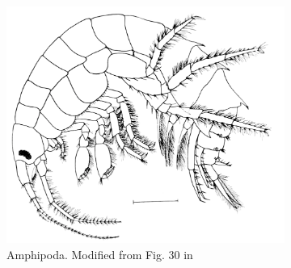 \documentclass[letterpaper, 11pt]{article}
\begin{document}
\begin{figure}[ht!]
    \centering
    \begin{subfigure}[ht!]{0.45\textwidth}
        \includegraphics[width=\textwidth]{amphipod30.png}
        \caption{Amphipoda. Modified from Fig. 30 in \cite{bhlitem148531crust}}
        \label{fig:amphip}
    \end{subfigure}
    \hfill %
    \begin{subfigure}[ht!]{0.25\textwidth}

\end{subfigure}
\end{figure}
\end{document}
